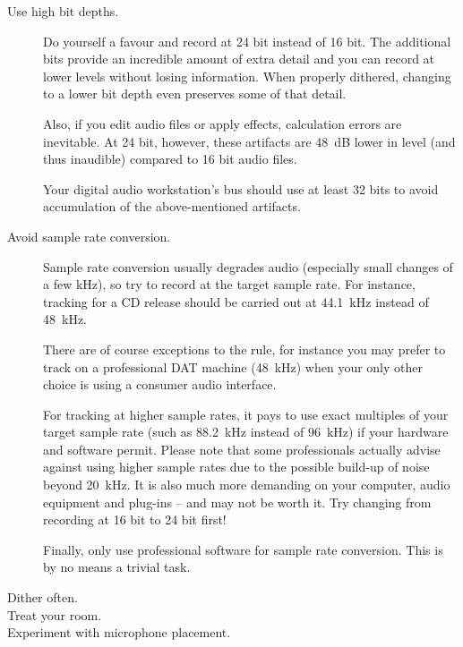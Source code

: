 \begin{description}
\item[Use high bit depths.]  Do yourself a favour and record at 24 bit
  instead of 16 bit.  The additional bits provide an incredible amount
  of extra detail and you can record at lower levels without losing
  information.  When properly dithered, changing to a lower bit depth
  even preserves some of that detail.

  Also, if you edit audio files or apply effects, calculation errors
  are inevitable.  At 24 bit, however, these artifacts are
  \SI{48}{\dB} lower in level (and thus inaudible) compared to 16 bit
  audio files.

  Your digital audio workstation's bus should use at least 32 bits to
  avoid accumulation of the above-mentioned artifacts.

\item[Avoid sample rate conversion.]  Sample rate conversion usually
  degrades audio (especially small changes of a few \si{\kilo\hertz}),
  so try to record at the target sample rate.  For instance, tracking
  for a CD release should be carried out at \SI{44.1}{\kilo\hertz}
  instead of \SI{48}{\kilo\hertz}.

  There are of course exceptions to the rule, for instance you may
  prefer to track on a professional DAT machine (\SI{48}{\kilo\hertz})
  when your only other choice is using a consumer audio interface.

  For tracking at higher sample rates, it pays to use exact multiples
  of your target sample rate (such as \SI{88.2}{\kilo\hertz} instead
  of \SI{96}{\kilo\hertz}) if your hardware and software permit.
  Please note that some professionals actually advise against using
  higher sample rates due to the possible build-up of noise beyond
  \SI{20}{\kilo\hertz}.  It is also much more demanding on your
  computer, audio equipment and plug-ins -- and may not be worth it.
  Try changing from recording at 16 bit to 24 bit first!

  Finally, only use professional software for sample rate conversion.
  This is by no means a trivial task.

\item[Dither often.]

\item[Treat your room.]

\item[Experiment with microphone placement.]

\end{description}

